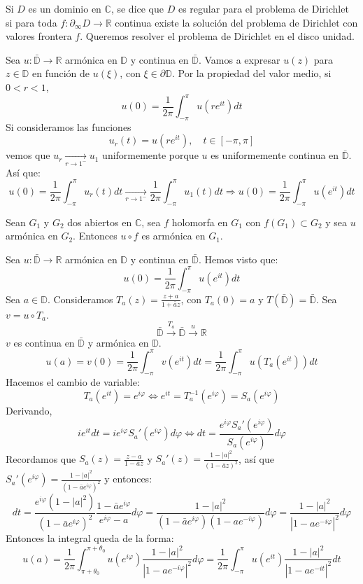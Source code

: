 Si $D$ es un dominio en $\mathbb{C}$, se dice que $D$ es regular para el problema de Dirichlet si para toda $f: \partial_\infty D \to \mathbb{R}$ continua existe la solución del problema de Dirichlet con valores frontera $f$.
Queremos resolver el problema de Dirichlet en el disco unidad.

Sea $u: \bar{\mathbb{D}} \to \mathbb{R}$ armónica en $\mathbb{D}$ y continua en $\bar{\mathbb{D}}$.
Vamos a expresar $u(z)$ para $z \in \mathbb{D}$ en función de $u(\xi)$, con $\xi \in \partial\mathbb{D}$.
Por la propiedad del valor medio, si $0 < r < 1$,
$$u(0) = \frac{1}{2\pi} \int_{-\pi}^\pi u(re^{it})dt$$
Si consideramos las funciones
$$u_r(t) = u(re^{it}), \quad t \in [-\pi, \pi]$$
vemos que $u_r \xrightarrow[r \to 1^-]{} u_1$ uniformemente porque $u$ es uniformemente continua en $\bar{\mathbb{D}}$.
Así que:
$$u(0) = \frac{1}{2\pi} \int_{-\pi}^\pi u_r(t)dt \xrightarrow[r \to 1^-]{} \frac{1}{2\pi} \int_{-\pi}^\pi u_1(t)dt \Rightarrow u(0) = \frac{1}{2\pi} \int_{-\pi}^\pi u(e^{it})dt$$

\begin{lemma}
    Sean $G_1$ y $G_2$ dos abiertos en $\mathbb{C}$, sea $f$ holomorfa en $G_1$ con $f(G_1) \subset G_2$ y sea $u$ armónica en $G_2$.
    Entonces $u \circ f$ es armónica en $G_1$.
\end{lemma}


Sea $u: \bar{\mathbb{D}} \to \mathbb{R}$ armónica en $\mathbb{D}$ y continua en $\bar{\mathbb{D}}$.
Hemos visto que:
$$u(0) = \frac{1}{2\pi} \int_{-\pi}^\pi u(e^{it})dt$$
Sea $a \in \mathbb{D}$.
Consideramos $T_a(z) = \frac{z+a}{1+\bar{a}z}$, con $T_a(0) = a$ y $T(\bar{\mathbb{D}}) = \bar{\mathbb{D}}$.
Sea $v = u \circ T_a$.
$$\bar{\mathbb{D}} \xrightarrow{T_a} \bar{\mathbb{D}} \xrightarrow{u} \mathbb{R}$$
$v$ es continua en $\bar{\mathbb{D}}$ y armónica en $\mathbb{D}$.
$$u(a) = v(0) = \frac{1}{2\pi} \int_{-\pi}^\pi v(e^{it})dt = \frac{1}{2\pi} \int_{-\pi}^\pi u(T_a(e^{it}))dt$$
Hacemos el cambio de variable:
$$T_a(e^{it}) = e^{i\varphi} \Leftrightarrow e^{it} = T_a^{-1}(e^{i\varphi}) = S_a(e^{i\varphi})$$
Derivando,
$$ie^{it}dt = ie^{i\varphi}S_a'(e^{i\varphi})d\varphi \Leftrightarrow dt = \frac{e^{i\varphi}S_a'(e^{i\varphi})}{S_a(e^{i\varphi})}d\varphi$$
Recordamos que $S_a(z) = \frac{z-a}{1-\bar{a}z}$ y $S_a'(z) = \frac{1-|a|^2}{(1-\bar{a}z)^2}$, así que $S_a'(e^{i\varphi}) = \frac{1-|a|^2}{(1-\bar{a}e^{i\varphi})^2}$ y entonces:
$$dt = \frac{e^{i\varphi}(1-|a|^2)}{(1-\bar{a}e^{i\varphi})^2}\frac{1-\bar{a}e^{i\varphi}}{e^{i\varphi}-a}d\varphi = \frac{1-|a|^2}{(1-\bar{a}e^{i\varphi})(1-ae^{-i\varphi})}d\varphi = \frac{1-|a|^2}{|1-ae^{-i\varphi}|^2}d\varphi$$
Entonces la integral queda de la forma:
$$u(a) = \frac{1}{2\pi} \int_{\pi + \theta_0}^{\pi + \theta_0} u(e^{i\varphi})\frac{1-|a|^2}{|1-ae^{-i\varphi}|^2}d\varphi = \frac{1}{2\pi} \int_{-\pi}^\pi u(e^{it})\frac{1-|a|^2}{|1-ae^{-it}|^2}dt$$

